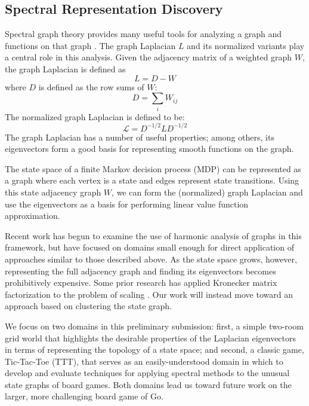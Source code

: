 \subsection{Spectral Representation Discovery}

Spectral graph theory provides many useful tools for analyzing a graph and
functions on that graph \citep{Chung1997Spectral}. The graph Laplacian $L$ and
its normalized variants play a central role in this analysis. Given the
adjacency matrix of a weighted graph $W$, the graph Laplacian is defined as
%
\begin{equation}
L = D-W
\end{equation}
%
where $D$ is defined as the row sums of $W$:
%
\begin{equation}
D = \sum_{i} W_{ij}
\end{equation}
%
The normalized graph Laplacian is defined to be:
%
\begin{equation}
\mathcal{L} = D^{-1/2}LD^{-1/2}
\label{eqn:norm.laplacian}
\end{equation}
%
The graph Laplacian has a number of useful properties; among others, its
eigenvectors form a good basis for representing smooth functions on the graph.

The state space of a finite Markov decision process (MDP) can be represented
as a graph where each vertex is a state and edges represent state transitions.
Using this state adjacency graph $W$, we can form the (normalized) graph 
Laplacian and use the eigenvectors as a basis for performing linear value 
function approximation.

Recent work
\citep{petrik2007analysis,mahadevan2006learning,Mahadevan2006Value,mahadevan2007proto}
has begun to examine the use of harmonic analysis of graphs in this framework,
but have focused on domains small enough for direct application of approaches
similar to those described above. As the state space grows, however,
representing the full adjacency graph and finding its eigenvectors becomes
prohibitively expensive. Some prior research has applied Kronecker matrix
factorization to the problem of scaling \citep{johns2007compact}. Our work will
instead move toward an approach based on clustering the state graph.

We focus on two domains in this preliminary submission: first, a simple
two-room grid world that highlights the desirable properties of the Laplacian
eigenvectors in terms of representing the topology of a state space; and
second, a classic game, Tic-Tac-Toe (TTT), that serves as an easily-understood
domain in which to develop and evaluate techniques for applying spectral
methods to the unusual state graphs of board games. Both domains lead us toward
future work on the larger, more challenging board game of Go.

